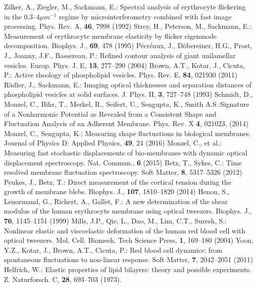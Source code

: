 \documentclass[graybox]{svmult}
\begin{document}
\begin{thebibliography}{99.}
Zilker, A., Ziegler, M., Sackmann, E.: Spectral analysis of erythrocyte flickering in the 0.3–4$\mu m^{-1}$ regime by microinterferometry combined with fast image processing. Phys. Rev. A, \textbf{46}, 7998 (1992)
%
Strey, H., Peterson, M., Sackmann, E.: Measurement of erythrocyte membrane elasticity by flicker eigenmode decomposition. Biophys. J., \textbf{69}, 478 (1995)
%
P\'{e}cr\'{e}aux, J., D\"{o}bereiner, H.G., Prost, J., Joanny, J.F., Bassereau, P.: Refined contour analysis of giant unilamellar vesicles. Europ. Phys. J. E, \textbf{13}, 277--290 (2004)
%
Brown, A.T., Kotar, J., Cicuta, P.: Active rheology of phospholipid vesicles. Phys. Rev. E, \textbf{84}, 021930 (2011)
%
R\"{a}dler, J., Sackmann, E.: Imaging optical thicknesses and separation distances of phospholipid vesicles at solid surfaces. J. Phys. II, \textbf{3}, 727--748 (1993)
%
Schmidt, D., Monzel, C., Bihr, T., Merkel, R., Seifert, U., Sengupta, K., Smith A.S.:Signature of a Nonharmonic Potential as Revealed from a Consistent Shape and Fluctuation Analysis of an Adherent Membrane. Phys. Rev. X \textbf{4}, 021023, (2014)
%
Monzel, C., Sengupta, K.: Measuring shape fluctuations in biological membranes. Journal of Physics D: Applied Physics, \textbf{49}, 24 (2016)
%
Monzel, C., et al.: Measuring fast stochastic displacements of bio-membranes with dynamic optical displacement spectroscopy. Nat. Commun., \textbf{6} (2015)
%
Betz, T., Sykes, C.: Time resolved membrane fluctuation spectroscopy. Soft Matter, \textbf{8}, 5317--5326 (2012)
%
Peukes, J., Betz, T.: Direct measurement of the cortical tension during the growth of membrane blebs. Biophys. J., \textbf{107}, 1810--1820 (2014)
%
Henon, S., Lenormand, G., Richert, A., Gallet, F.: A new determination of the shear modulus of the human erythrocyte membrane using optical tweezers. Biophys. J., \textbf{76}, 1145--1151 (1999)
%
Mills, J.P., Qie, L., Dao, M., Lim, C.T., Suresh, S.: Nonlinear elastic and viscoelastic deformation of the human red blood cell with optical tweezers. Mol. Cell. Biomech. Tech Science Press, \textbf{1}, 169--180 (2004)
%
Yoon, Y.Z., Kotar, J., Brown, A.T., Cicuta, P.: Red blood cell dynamics: from spontaneous fluctuations to non-linear response. Soft Matter, \textbf{7}, 2042--2051 (2011)
%
Helfrich, W.: Elastic properties of lipid bilayers: theory and possible experiments. Z. Naturforsch. C, \textbf{28}, 693--703 (1973).

\end{thebibliography}
\end{document}
